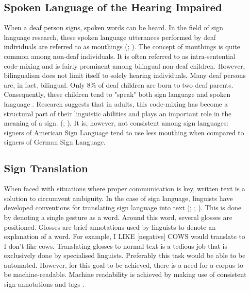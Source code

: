 \subsection{Spoken Language of the Hearing Impaired}

When a deaf person signs, spoken words can be heard. In the field of sign language research, these spoken language utterances performed by deaf individuals are referred to as mouthings (\citealp{kristoffersen2016designing}; \citealp{braem2001functions}). The concept of mouthings is quite common among non-deaf individuals. It is often referred to as intra-sentential code-mixing \cite{paradis2000early} and is fairly prominent among bilingual non-deaf children. However, bilingualism does not limit itself to solely hearing individuals. Many deaf persons are, in fact, bilingual. Only 8\% of deaf children are born to two deaf parents. Consequently, these children tend to "speak" both sign language and spoken language \cite{perniss2007}. Research suggests that in adults, this code-mixing has become a structural part of their linguistic abilities and plays an important role in the meaning of a sign. (\citealp{pfaff1979constraints};  \citealp{kristoffersen2016designing}). It is, however, not consistent among sign languages: signers of American Sign Language tend to use less mouthing when compared to signers of German Sign Language.

\subsection{Sign Translation}

When faced with situations where proper communication is key, written text is a solution to circumvent ambiguity. In the case of sign language, linguists have developed conventions for translating sign language into text (\citealp{kristoffersen2016designing}; \citealp{aouiti2015arab}; \citealp{porta2014rule}). This is done by denoting a single gesture as a word. Around this word, several glosses are positioned.  Glosses are brief annotations used by linguists to denote an explanation of a word. For example, I LIKE [negative] COWS would translate to I don't like cows. Translating glosses to normal text is a tedious job that is exclusively done by specialised linguists. Preferably this task would be able to be automated. However, for this goal to be achieved, there is a need for a corpus to be machine-readable. Machine readability is achieved by making use of consistent sign annotations and tags \cite{johnston2008corpus}. 


